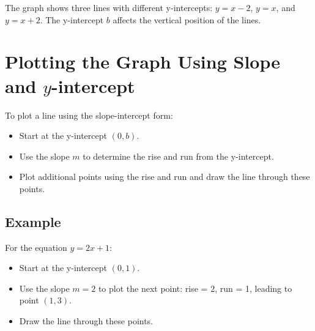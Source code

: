 \documentclass{article}
\begin{document}
\begin{center}
\end{center}

The graph shows three lines with different y-intercepts: \( y = x - 2 \), \( y = x \), and \( y = x + 2 \). The y-intercept \( b \) affects the vertical position of the lines.

\newpage

\section*{Plotting the Graph Using Slope and $y$-intercept}

To plot a line using the slope-intercept form:
\begin{itemize}
    \item Start at the y-intercept \((0, b)\).
    \item Use the slope \( m \) to determine the rise and run from the y-intercept.
    \item Plot additional points using the rise and run and draw the line through these points.
\end{itemize}

\subsection*{Example}

For the equation \( y = 2x + 1 \):
\begin{itemize}
    \item Start at the y-intercept \((0, 1)\).
    \item Use the slope \( m = 2 \) to plot the next point: rise = 2, run = 1, leading to point \((1, 3)\).
    \item Draw the line through these points.
\end{itemize}
\end{document}
